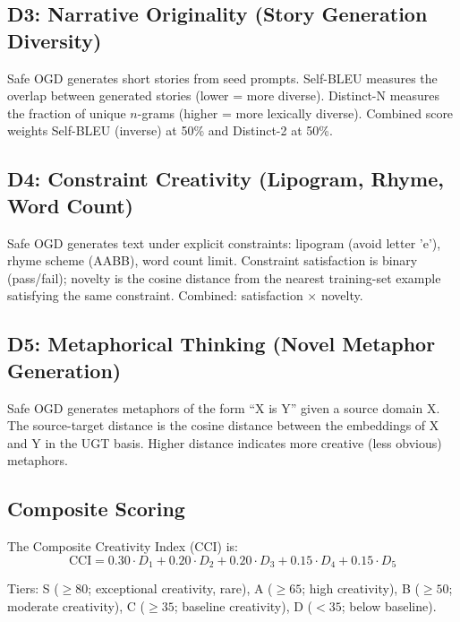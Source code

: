 \documentclass[11pt,a4paper]{article}
\theoremstyle{plain}\newtheorem{theorem}{Theorem}[section]
\begin{document}
\subsection{D3: Narrative Originality (Story Generation Diversity)}

Safe OGD generates short stories from seed prompts. Self-BLEU measures the overlap between generated stories (lower = more diverse). Distinct-N measures the fraction of unique $n$-grams (higher = more lexically diverse). Combined score weights Self-BLEU (inverse) at 50\% and Distinct-2 at 50\%.

\subsection{D4: Constraint Creativity (Lipogram, Rhyme, Word Count)}

Safe OGD generates text under explicit constraints: lipogram (avoid letter 'e'), rhyme scheme (AABB), word count limit. Constraint satisfaction is binary (pass/fail); novelty is the cosine distance from the nearest training-set example satisfying the same constraint. Combined: satisfaction $\times$ novelty.

\subsection{D5: Metaphorical Thinking (Novel Metaphor Generation)}

Safe OGD generates metaphors of the form ``X is Y'' given a source domain X. The source-target distance is the cosine distance between the embeddings of X and Y in the UGT basis. Higher distance indicates more creative (less obvious) metaphors.

\subsection{Composite Scoring}

The Composite Creativity Index (CCI) is:
\begin{equation}
\mathrm{CCI} = 0.30 \cdot D_1 + 0.20 \cdot D_2 + 0.20 \cdot D_3 + 0.15 \cdot D_4 + 0.15 \cdot D_5
\end{equation}

Tiers: S ($\ge 80$; exceptional creativity, rare), A ($\ge 65$; high creativity), B ($\ge 50$; moderate creativity), C ($\ge 35$; baseline creativity), D ($<35$; below baseline).
\end{document}

